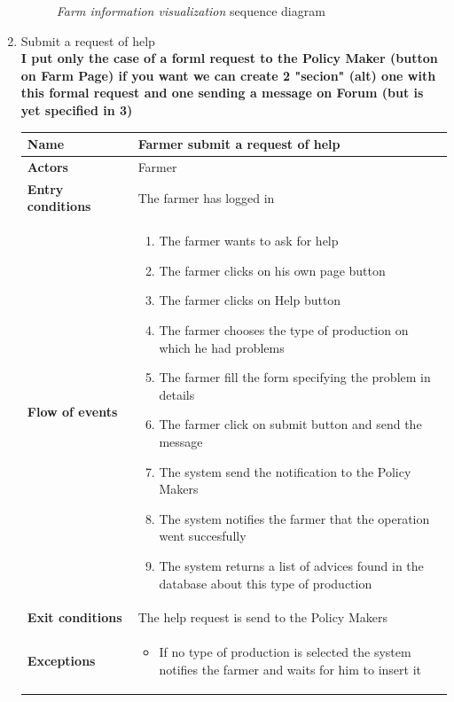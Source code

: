 \begin{enumerate}
\begin{figure}[H]
\begin{center}
        \caption{\emph{Farm information visualization} sequence diagram}
        \label{fig:sequence5}
        \end{center}
    \end{figure}

    \item Submit a request of help\\
    \textbf{I put only the case of a forml request to the Policy Maker (button on Farm Page) if you want we can create 2 "secion" (alt) one with this formal request and one sending a message on Forum (but is yet specified in 3)}
    \begin{longtable}{p{0.26\linewidth}p{0.75\linewidth}}
        \toprule
        \textbf{Name} & \textbf{Farmer submit a request of help} \\
        \midrule
        \textbf{Actors} & Farmer \\
        \midrule
        \textbf{Entry conditions} & The farmer has logged in\\
        \midrule
        \textbf{Flow of events} & 
        \begin{enumerate}
            \item The farmer wants to ask for help
            \item The farmer clicks on his own page button
            \item The farmer clicks on Help button
            \item The farmer chooses the type of production on which he had problems
            \item The farmer fill the form specifying the problem in details
            \item The farmer click on submit button and send the message
            \item The system send the notification to the Policy Makers
            \item The system notifies the farmer that the operation went succesfully
            \item The system returns a list of advices found in the database about this type of production
        \end{enumerate} \\
        \midrule
        \textbf{Exit conditions} & The help request is send to the Policy Makers\\
        \midrule
        \textbf{Exceptions} & 
        \begin{itemize}
            \item If no type of production is selected the system notifies the farmer and waits for him to insert it

\end{itemize}
\end{longtable}
\end{enumerate}
